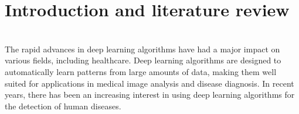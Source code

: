\documentclass[journal]{IEEEtran}
\begin{document}
\section{Introduction and literature review}
\label{sec:intro}\\
\newline The rapid advances in deep learning algorithms have had a major impact on various fields, including healthcare. Deep learning algorithms are designed to automatically learn patterns from large amounts of data, making them well suited for applications in medical image analysis and disease diagnosis. In recent years, there has been an increasing interest in using deep learning algorithms for the detection of human diseases.
\\
\end{document}
